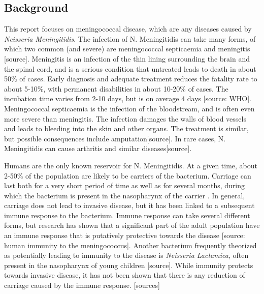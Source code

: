 \documentclass[10pt,a4paper]{article}
\begin{document}


\subsection{Background}

This report focuses on meningococcal disease, which are any diseases caused by \emph{Neisseria Meningitidis}. The infection of N. Meningitidis can take many forms, of which two common (and severe) are meningococcal septicaemia and meningitis [source]. Meningitis is an infection of the thin lining surrounding the brain and the spinal cord, and is a serious condition that untreated leads to death in about 50\% of cases. Early diagnosis and adequate treatment reduces the fatality rate to about 5-10\%, with permanent disabilities in about 10-20\% of cases. The incubation time varies from 2-10 days, but is on average 4 days [source: WHO]. Meningococcal septicaemia is the infection of the bloodstream, and is often even more severe than meningitis. The infection damages the walls of blood vessels and leads to bleeding into the skin and other organs. The treatment is similar, but possible consequences include amputation[source]. In rare cases, N. Meningitidis can cause arthritis and similar diseases[source].

Humans are the only known reservoir for N. Meningitidis. At a given time, about 2-50\% of the population are likely to be carriers of the bacterium. Carriage can last both for a very short period of time as well as for several months, during which the bacterium is present in the nasopharynx of the carrier \cite{taha2002duality}.  In general, carriage does not lead to invasive disease, but it has been linked to a subsequent immune response to the bacterium. Immune response can take several different forms, but research has shown that a significant part of the adult population have an immune response that is putatively protective towards the disease [source: human immunity to the meningococcus]. Another bacterium frequently theorized as potentially leading to immunity to the disease is \emph{Neisseria Lactamica}, often present in the nasopharynx of young children [source]. While immunity protects towards invasive disease, it has not been shown that there is any reduction of carriage caused by the immune response. [sources]
\end{document}
